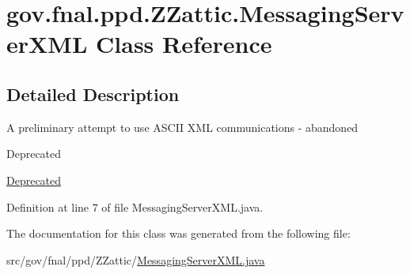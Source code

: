 \hypertarget{classgov_1_1fnal_1_1ppd_1_1ZZattic_1_1MessagingServerXML}{\section{gov.\-fnal.\-ppd.\-Z\-Zattic.\-Messaging\-Server\-X\-M\-L Class Reference}
\label{classgov_1_1fnal_1_1ppd_1_1ZZattic_1_1MessagingServerXML}
}


\subsection{Detailed Description}
A preliminary attempt to use A\-S\-C\-I\-I X\-M\-L communications -\/ abandoned \begin{DoxyRefDesc}{Deprecated}
\item[\hyperlink{deprecated__deprecated000022}{Deprecated}]\end{DoxyRefDesc}


Definition at line 7 of file Messaging\-Server\-X\-M\-L.\-java.



The documentation for this class was generated from the following file\-:\begin{DoxyCompactItemize}
\item 
src/gov/fnal/ppd/\-Z\-Zattic/\hyperlink{MessagingServerXML_8java}{Messaging\-Server\-X\-M\-L.\-java}\end{DoxyCompactItemize}
